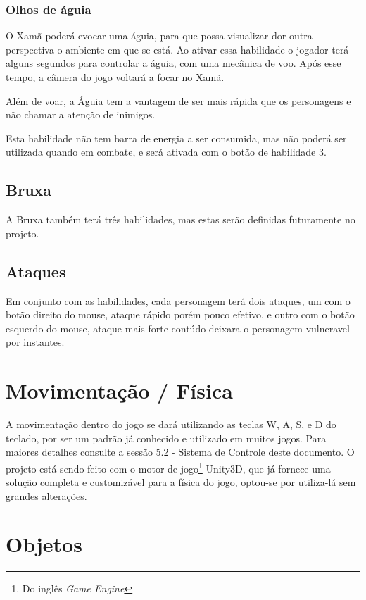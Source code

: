 \subsubsection{Olhos de águia}

O Xamã poderá evocar uma águia, para que possa visualizar dor outra perspectiva o ambiente em que se está. Ao ativar essa habilidade o jogador terá alguns segundos para controlar a águia, com uma mecânica de voo. Após esse tempo, a câmera do jogo voltará a focar no Xamã.

Além de voar, a Águia tem a vantagem de ser mais rápida que os personagens e não chamar a atenção de inimigos.

Esta habilidade não tem barra de energia a ser consumida, mas não poderá ser utilizada quando em combate, e será ativada com o botão de habilidade 3. 


\subsection{Bruxa}

A Bruxa também terá três habilidades, mas estas serão definidas futuramente no projeto. 

\subsection{Ataques}
Em conjunto com as habilidades, cada personagem terá dois ataques, um com o botão direito do mouse, ataque rápido porém pouco efetivo, e outro com o botão esquerdo do mouse, ataque mais forte contúdo deixara o personagem vulneravel por instantes.


\section{Movimentação / Física}
A movimentação dentro do jogo se dará utilizando as teclas W, A, S, e D do teclado, por ser um padrão já conhecido e utilizado em muitos jogos. Para maiores detalhes consulte a sessão 5.2 - Sistema de Controle deste documento.
O projeto está sendo feito com o motor de jogo\footnote{Do inglês \textit{Game Engine}} Unity3D, que já fornece uma solução completa e customizável para a física do jogo, optou-se por utiliza-lá sem grandes alterações.


\section{Objetos}

